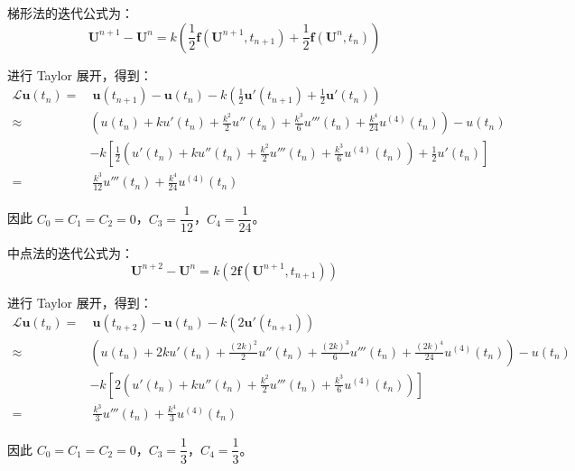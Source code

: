 \documentclass[a4paper]{article}
\begin{document}
\par 梯形法的迭代公式为：
\begin{equation}
    \mathbf{U}^{n+1}
    -\mathbf{U}^{n}
    =k\left(
        \frac{1}{2} \mathbf{f}\left(\mathbf{U}^{n+1}, t_{n+1}\right)
        +\frac{1}{2} \mathbf{f}\left(\mathbf{U}^{n}, t_{n}\right)
    \right)
\end{equation}
\par 进行 Taylor 展开，得到：
\begin{equation}
    \begin{aligned}
        \mathcal{L}\mathbf{u}(t_n)
        =&\ \mathbf{u}(t_{n+1})
        -\mathbf{u}(t_{n})
        -k\left(
            \frac{1}{2} \mathbf{u}'(t_{n+1})
            +\frac{1}{2} \mathbf{u}'(t_{n})
        \right)\\
        \approx&\left(
            u(t_n) + k u'(t_n) + \frac{k^2}{2} u''(t_n) + \frac{k^3}{6} u'''(t_n) + \frac{k^4}{24} u^{(4)}(t_n)
        \right)
        -u(t_n)\\
        &-k\left[
            \frac{1}{2} \left(
                u'(t_n) + k u''(t_n) + \frac{k^2}{2} u'''(t_n) + \frac{k^3}{6} u^{(4)}(t_n)
            \right)
            +\frac{1}{2} u'(t_{n})
        \right]\\
        = &\  \frac{k^3}{12} u'''(t_n) + \frac{k^4}{24} u^{(4)}(t_n)
    \end{aligned}
\end{equation}
\par 因此 $C_0=C_1=C_2=0$，$C_3=\dfrac{1}{12}$，$C_4=\dfrac{1}{24}$。
\par 中点法的迭代公式为：
\begin{equation}
    \mathbf{U}^{n+2}
    -\mathbf{U}^{n}
    =k\left(
        2\mathbf{f}\left(\mathbf{U}^{n+1}, t_{n+1}\right)
    \right)
\end{equation}
\par 进行 Taylor 展开，得到：
\begin{equation}
    \begin{aligned}
        \mathcal{L}\mathbf{u}(t_n)
        =&\ \mathbf{u}(t_{n+2})
        -\mathbf{u}(t_{n})
        -k\left(
            2 \mathbf{u}'(t_{n+1})
        \right)\\
        \approx&\left(
            u(t_n) + 2k u'(t_n) + \frac{(2k)^2}{2} u''(t_n) 
            + \frac{(2k)^3}{6} u'''(t_n) + \frac{(2k)^4}{24} u^{(4)}(t_n)
        \right)
        -u(t_n)\\
        &-k\left[
            2 \left(
                u'(t_n) + k u''(t_n) + \frac{k^2}{2} u'''(t_n) + \frac{k^3}{6} u^{(4)}(t_n)
            \right)
        \right]\\
        = &\  \frac{k^3}{3} u'''(t_n) + \frac{k^4}{3} u^{(4)}(t_n)
    \end{aligned}
\end{equation}
\par 因此 $C_0=C_1=C_2=0$，$C_3=\dfrac{1}{3}$，$C_4=\dfrac{1}{3}$。
\end{document}
